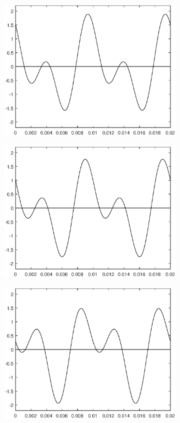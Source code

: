 \documentclass[11pt,a4paper]{article}
\begin{document}
\begin{figure}[htbp]
\begin{subfigure}{0.48\textwidth}
\includegraphics[scale=0.5]{phase_060}
\end{subfigure}
\begin{subfigure}{0.48\textwidth}
\includegraphics[scale=0.5]{phase_090}
\end{subfigure}
\begin{subfigure}{0.48\textwidth}
\includegraphics[scale=0.5]{phase_135}

\end{subfigure}
\end{figure}
\end{document}
